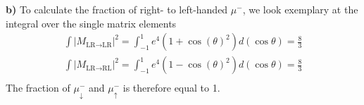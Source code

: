 \documentclass{article}
\begin{document}
\textbf{b)} To calculate the fraction of right- to left-handed \( \mu ^{-} \),
we look exemplary at the integral over the single matrix elements
\begin{align}
    \nonumber \int \left| M _{\text{LR} \rightarrow \text{LR}} \right|^2 =
    \int_{-1}^{1} e ^{4} \left( 1+ \cos \left( \theta \right) ^2\right)
    d \left( \cos \theta \right) = \frac{8}{3} \\
    \int \left| M _{\text{LR} \rightarrow \text{RL}} \right|^2 =
    \int_{-1}^{1} e ^{4} \left( 1- \cos \left( \theta \right) ^2\right)
    d \left( \cos \theta \right) = \frac{8}{3} \\
\end{align}
The fraction of \( \mu ^{-} _{\downarrow} \) and \( \mu ^{-} _{\uparrow} \)
is therefore equal to 1.
\end{document}
